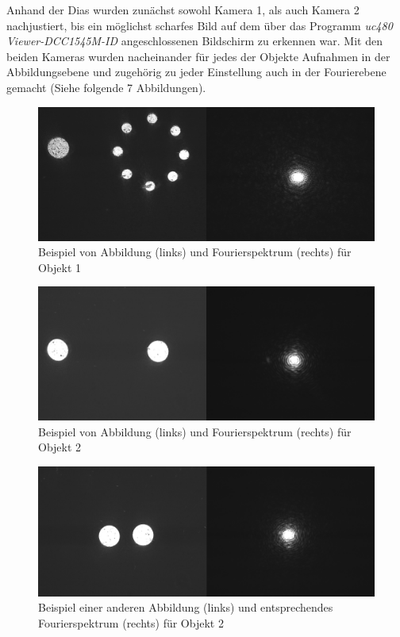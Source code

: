 Anhand der Dias wurden zunächst sowohl Kamera 1, als auch Kamera 2 nachjustiert, bis ein möglichst scharfes Bild auf dem über das Programm \textit{uc480 Viewer-DCC1545M-ID} angeschlossenen Bildschirm zu erkennen war. Mit den beiden Kameras wurden nacheinander für jedes der Objekte Aufnahmen in der Abbildungsebene und zugehörig zu jeder Einstellung auch in der Fourierebene gemacht (Siehe folgende 7 Abbildungen). 

\begin{figure}
\centering
\includegraphics[width=0.7\linewidth]{images/edit-xcf/example1}
\caption{Beispiel von Abbildung (links) und Fourierspektrum (rechts) für Objekt 1}
\label{fig:example1}
\end{figure}

\begin{figure}
\centering
\includegraphics[width=0.7\linewidth]{images/edit-xcf/example2}
\caption{Beispiel von Abbildung (links) und Fourierspektrum (rechts) für Objekt 2}
\label{fig:example2}
\end{figure}

\begin{figure}
\centering
\includegraphics[width=0.7\linewidth]{images/edit-xcf/example3}
\caption{Beispiel einer anderen Abbildung (links) und entsprechendes Fourierspektrum (rechts) für Objekt 2}
\label{fig:example3}
\end{figure}

